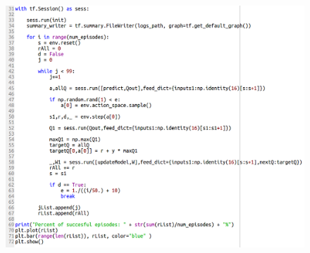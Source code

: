 \begin{figure}[ht]
	\centering
	\includegraphics*[width=15cm,height=20cm,keepaspectratio]{figuras/q_net2} 
	\label{fig:q_network code 2}
\end{figure}

